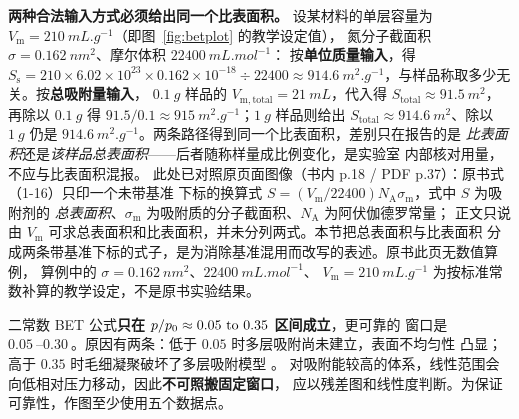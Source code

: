 \textbf{两种合法输入方式必须给出同一个比表面积。} 设某材料的单层容量为
$V_{\mathrm{m}}=210\ \unit{mL.g^{-1}}$（即图~\ref{fig:betplot} 的教学设定值），
氮分子截面积 $\sigma=0.162\ \unit{nm^2}$、摩尔体积 $22400\ \unit{mL.mol^{-1}}$：
按\textbf{单位质量输入}，得
$S_{\mathrm{s}}=210\times6.02\times10^{23}\times0.162\times10^{-18}\div22400
\approx914.6\ \unit{m^2.g^{-1}}$，与样品称取多少无关。按\textbf{总吸附量输入}，
$0.1\ \unit{g}$ 样品的 $V_{\mathrm{m,total}}=21\ \unit{mL}$，代入得
$S_{\mathrm{total}}\approx91.5\ \unit{m^2}$，再除以 $0.1\ \unit{g}$ 得
$91.5/0.1\approx915\ \unit{m^2.g^{-1}}$；$1\ \unit{g}$ 样品则给出
$S_{\mathrm{total}}\approx914.6\ \unit{m^2}$、除以 $1\ \unit{g}$ 仍是
$914.6\ \unit{m^2.g^{-1}}$。两条路径得到同一个比表面积，差别只在报告的是
\emph{比表面积}还是\emph{该样品总表面积}——后者随称样量成比例变化，是实验室
内部核对用量，不应与比表面积混报。
此处已对照原页面图像（书内 p.18 / PDF p.37）：原书式（1-16）只印一个未带基准
下标的换算式 $S=(V_{\mathrm{m}}/22400)N_{\mathrm{A}}\sigma_{\mathrm{m}}$，式中 $S$ 为吸附剂的
\emph{总表面积}、$\sigma_{\mathrm{m}}$ 为吸附质的分子截面积、$N_{\mathrm{A}}$ 为阿伏伽德罗常量；
正文只说由 $V_{\mathrm{m}}$ 可求总表面积和比表面积，并未分列两式。本节把总表面积与比表面积
分成两条带基准下标的式子，是为消除基准混用而改写的表述。原书此页无数值算例，
算例中的 $\sigma=0.162\ \unit{nm^2}$、$22400\ \unit{mL.mol^{-1}}$、
$V_{\mathrm{m}}=210\ \unit{mL.g^{-1}}$ 为按标准常数补算的教学设定，不是原书实验结果。

\begin{keycond}
二常数 BET 公式\textbf{只在 $\ppzero\approx\qtyrange{0.05}{0.35}{}$ 区间成立}，更可靠的
窗口是 $\qtyrange{0.05}{0.30}{}$。原因有两条：低于 $0.05$ 时多层吸附尚未建立，表面不均匀性
凸显；高于 $0.35$ 时毛细凝聚破坏了多层吸附模型 。
对吸附能较高的体系，线性范围会向低相对压力移动，因此\textbf{不可照搬固定窗口}，
应以残差图和线性度判断。为保证可靠性，作图至少使用五个数据点。
\end{keycond}

